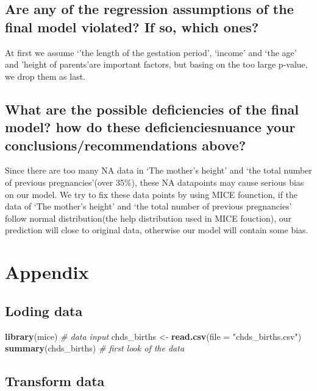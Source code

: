 \documentclass[]{article}
\newenvironment{Shaded}{\begin{snugshade}}{\end{snugshade}}
\newcommand{\KeywordTok}[1]{\textcolor[rgb]{0.13,0.29,0.53}{\textbf{#1}}}
\newcommand{\DataTypeTok}[1]{\textcolor[rgb]{0.13,0.29,0.53}{#1}}
\newcommand{\StringTok}[1]{\textcolor[rgb]{0.31,0.60,0.02}{#1}}
\newcommand{\CommentTok}[1]{\textcolor[rgb]{0.56,0.35,0.01}{\textit{#1}}}
\newcommand{\NormalTok}[1]{#1}
\begin{document}
\subsection{Are any of the regression assumptions of the final model violated? If so, which ones?}

At first we assume `'the length of the gestation period', `income' and
`the age' and 'height of parents'are important factors, but basing on
the too large p-value, we drop them as last.

\subsection{What are the possible deficiencies of the final model?   how do these deficienciesnuance your conclusions/recommendations above?}

Since there are too many NA data in `The mother's height' and `the total
number of previous pregnancies'(over 35\%), these NA datapoints may
cause serious bias on our model. We try to fix these data points by
using MICE founction, if the data of `The mother's height' and `the
total number of previous pregnancies' follow normal distribution(the
help distribution used in MICE fouction), our prediction will close to
original data, otherwise our model will contain some bias.

\section{Appendix}

\subsection{Loding data}\label{loding-data}

\begin{Shaded}
\begin{Highlighting}[]
\KeywordTok{library}\NormalTok{(mice)}
\CommentTok{# data input}
\NormalTok{chds_births <-}\StringTok{ }\KeywordTok{read.csv}\NormalTok{(}\DataTypeTok{file =} \StringTok{"chds_births.csv"}\NormalTok{) }
\KeywordTok{summary}\NormalTok{(chds_births) }\CommentTok{# first look of the data}
\end{Highlighting}
\end{Shaded}

\subsection{Transform data}\label{transform-data}
\end{document}
